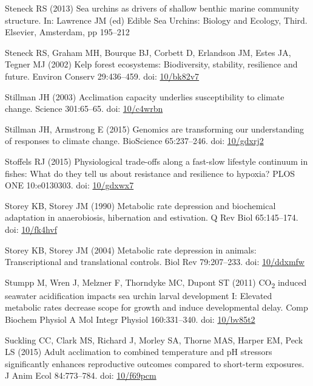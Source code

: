 \documentclass[a4paper,10pt, oneside]{memoir}
\begin{document}
\leavevmode\hypertarget{ref-Steneck2013}{}%
Steneck RS (2013) Sea urchins as drivers of shallow benthic marine community structure. In: Lawrence JM (ed) Edible Sea Urchins: Biology and Ecology, Third. Elsevier, Amsterdam, pp 195--212

\leavevmode\hypertarget{ref-Steneck2002}{}%
Steneck RS, Graham MH, Bourque BJ, Corbett D, Erlandson JM, Estes JA, Tegner MJ (2002) Kelp forest ecosystems: Biodiversity, stability, resilience and future. Environ Conserv 29:436--459. doi: \href{https://doi.org/10/bk82v7}{10/bk82v7}

\leavevmode\hypertarget{ref-Stillman2003}{}%
Stillman JH (2003) Acclimation capacity underlies susceptibility to climate change. Science 301:65--65. doi: \href{https://doi.org/10/c4wrbn}{10/c4wrbn}

\leavevmode\hypertarget{ref-Stillman2015}{}%
Stillman JH, Armstrong E (2015) Genomics are transforming our understanding of responses to climate change. BioScience 65:237--246. doi: \href{https://doi.org/10/gdxrj2}{10/gdxrj2}

\leavevmode\hypertarget{ref-Stoffels2015}{}%
Stoffels RJ (2015) Physiological trade-offs along a fast-slow lifestyle continuum in fishes: What do they tell us about resistance and resilience to hypoxia? PLOS ONE 10:e0130303. doi: \href{https://doi.org/10/gdxwx7}{10/gdxwx7}

\leavevmode\hypertarget{ref-Storey1990}{}%
Storey KB, Storey JM (1990) Metabolic rate depression and biochemical adaptation in anaerobiosis, hibernation and estivation. Q Rev Biol 65:145--174. doi: \href{https://doi.org/10/fk4hvf}{10/fk4hvf}

\leavevmode\hypertarget{ref-Storey2004}{}%
Storey KB, Storey JM (2004) Metabolic rate depression in animals: Transcriptional and translational controls. Biol Rev 79:207--233. doi: \href{https://doi.org/10/ddxmfw}{10/ddxmfw}

\leavevmode\hypertarget{ref-Stumpp2011}{}%
Stumpp M, Wren J, Melzner F, Thorndyke MC, Dupont ST (2011) CO\textsubscript{2} induced seawater acidification impacts sea urchin larval development I: Elevated metabolic rates decrease scope for growth and induce developmental delay. Comp Biochem Physiol A Mol Integr Physiol 160:331--340. doi: \href{https://doi.org/10/bv85t2}{10/bv85t2}

\leavevmode\hypertarget{ref-Suckling2015}{}%
Suckling CC, Clark MS, Richard J, Morley SA, Thorne MAS, Harper EM, Peck LS (2015) Adult acclimation to combined temperature and pH stressors significantly enhances reproductive outcomes compared to short-term exposures. J Anim Ecol 84:773--784. doi: \href{https://doi.org/10/f69pcm}{10/f69pcm}
\end{document}
